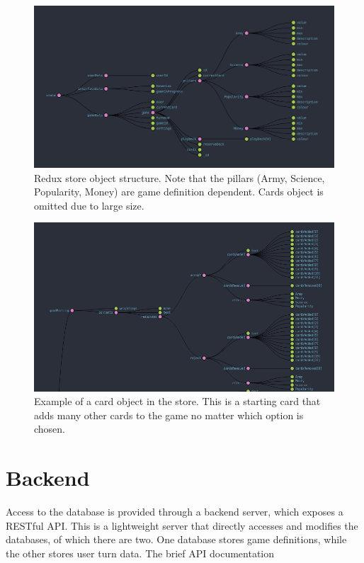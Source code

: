 \begin{figure}[!h]
	\centering
	\includegraphics[width=1.0\textwidth]{./images/design/store_shape.png}
	\caption{Redux store object structure. Note that the pillars (Army, Science, Popularity, Money) are game definition dependent. Cards object is omitted due to large size.}
	\label{fig:store_shape}
\end{figure}

\begin{figure}[!h]
	\centering
	\includegraphics[width=1.0\textwidth]{./images/design/card_example.png}
	\caption{Example of a card object in the store. This is a starting card that adds many other cards to the game no matter which option is chosen.}
	\label{fig:card_example}
\end{figure}

\section{Backend}
Access to the database is provided through a backend server, which exposes a RESTful \cite{REST} API. This is a lightweight server that directly accesses and modifies the databases, of which there are two. One database stores game definitions, while the other stores user turn data.
The brief API documentation 

